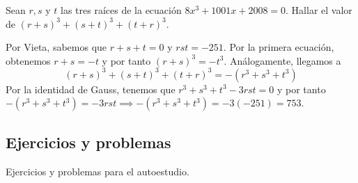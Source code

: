 \begin{example}[AIME II, 2008]
    Sean $r, s$ y $t$ las tres raíces de la ecuación $8x^3 + 1001x + 2008 = 0$.
    Hallar el valor de $(r + s)^3 + (s + t)^3 + (t + r)^3$.
\end{example}
\begin{solution}
    Por Vieta, sabemos que $r +  s + t = 0$ y $r s t = -251$.
    Por la primera ecuación, obtenemos $r + s = -t$ y por tanto $(r + s)^3 = - t^3$.
    Análogamente, llegamos a
    \[
        (r + s)^3 + (s + t)^3 + (t + r)^3 =  -(r^3 + s^3 + t^3)
    \]
    Por la identidad de Gauss, tenemos que $r^3 + s^3 + t^3 - 3rst = 0$ y por tanto $-(r^3 + s^3 + t^3) = -3rst \implies -(r^3 + s^3 + t^3) = -3(-251) = \boxed{753}$.
\end{solution}



\subsection{Ejercicios y problemas}

Ejercicios y problemas para el autoestudio.

